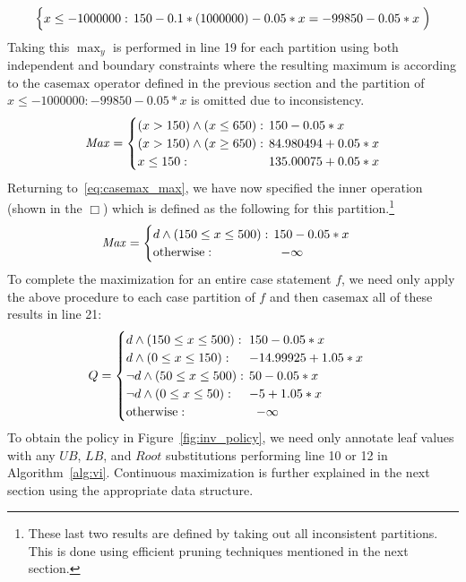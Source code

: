 \documentclass[twoside,11pt]{article}
\newcommand{\casemax}{\mathrm{casemax}}
\newcommand{\UB}{\mathit{UB}}
\newcommand{\LB}{\mathit{LB}}
\newcommand{\Root}{\mathit{Root}}
\newcommand{\Max}{\mathit{Max}}
\newcommand{\sqm}{\hspace{-2mm}}
\begin{document}
\begin{enumerate}
{\begin{align*}
\begin{cases}
x \leq -1000000: & \sqm 150 - 0.1 * (1000000) - 0.05 * x =  -99850 -0.05 * x\\ 
\end{cases} \Big) 
\end{align*}}
Taking this $\max_y$ is performed in line 19 for each partition using both independent and boundary constraints where the resulting maximum is according to the $\casemax$ operator defined in the previous section and the partition of $x \leq -1000000:  -99850 -0.05 * x$ is omitted due to inconsistency.
{\footnotesize 
\begin{align*}
\Max = 
\begin{cases}
(x > 150) \land (x \leq 650):    & \sqm 150 - 0.05 * x \\ 
(x > 150) \land (x \geq 650):    & \sqm 84.980494 + 0.05 * x \\ 
x \leq 150: & \sqm 135.00075 + 0.05 * x\\ 
\end{cases}
\end{align*}}
Returning to~\eqref{eq:casemax_max}, we have now specified the inner operation (shown in the $\Box$) which is defined as the following for this partition.\footnote{ These last two results are defined by taking out all inconsistent partitions. This is done using efficient pruning techniques mentioned in the next section.}
\begin{align*}
\Max & = 
\begin{cases}
d \land (150 \leq x \leq 500):    & \sqm 150 - 0.05 * x \\ 
\text{\normalsize otherwise} : & -\infty\\ 
\end{cases}
\end{align*}
To complete the maximization for an entire case statement $f$, we need only apply the above procedure to each case partition of $f$ and then $\casemax$ all of these results in line 21: 
\begin{align*}
Q & = 
\begin{cases}
d \land (150 \leq x \leq 500):    & \sqm 150 - 0.05 * x \\ 
d \land (0 \leq x \leq 150):    & \sqm -14.99925 + 1.05 * x \\ 
\neg d \land (50 \leq x \leq 500):    & \sqm 50 - 0.05 * x \\ 
\neg d \land (0 \leq x \leq 50):    & \sqm -5 + 1.05 * x \\ 
\text{\normalsize otherwise} : & -\infty\\ 
\end{cases}
\end{align*}
To obtain the policy in Figure~\ref{fig:inv_policy}, 
we need only annotate leaf values with any 
$\UB$, $\LB$, and $\Root$ substitutions performing line 10 or 12 in Algorithm~\ref{alg:vi}.
Continuous maximization is further explained in the next section using the appropriate data structure. 


\end{enumerate}
\end{document}
